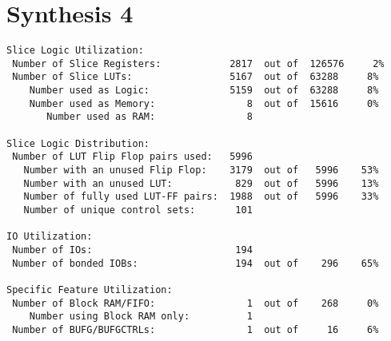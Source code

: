 \section{Synthesis 4}
\begin{verbatim}
Slice Logic Utilization: 
 Number of Slice Registers:            2817  out of  126576     2%  
 Number of Slice LUTs:                 5167  out of  63288     8%  
    Number used as Logic:              5159  out of  63288     8%  
    Number used as Memory:                8  out of  15616     0%  
       Number used as RAM:                8

Slice Logic Distribution: 
 Number of LUT Flip Flop pairs used:   5996
   Number with an unused Flip Flop:    3179  out of   5996    53%  
   Number with an unused LUT:           829  out of   5996    13%  
   Number of fully used LUT-FF pairs:  1988  out of   5996    33%  
   Number of unique control sets:       101

IO Utilization: 
 Number of IOs:                         194
 Number of bonded IOBs:                 194  out of    296    65%  

Specific Feature Utilization:
 Number of Block RAM/FIFO:                1  out of    268     0%  
    Number using Block RAM only:          1
 Number of BUFG/BUFGCTRLs:                1  out of     16     6%  
\end{verbatim}
